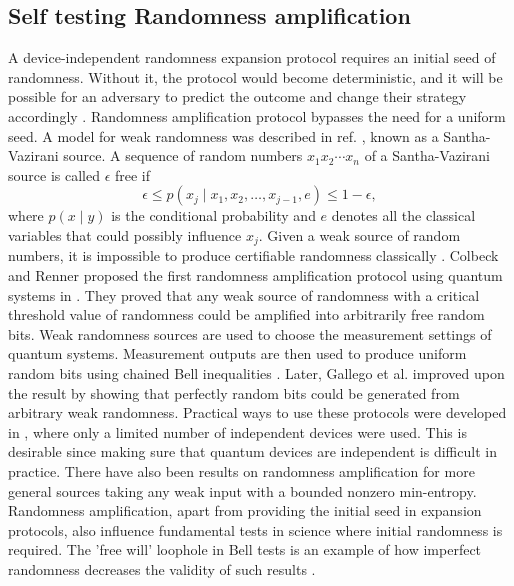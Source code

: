 \documentclass[]{interact}
\theoremstyle{plain}%
\theoremstyle{definition}
\theoremstyle{remark}
\begin{document}
\subsection{ Self testing Randomness amplification} 
\label{randampDI}
A device-independent randomness expansion protocol requires an initial seed of randomness. Without it, the protocol would become deterministic, and it will be possible for an adversary to predict the outcome and change their strategy accordingly \cite{Colbeck_2012}. Randomness amplification protocol bypasses the need for a uniform seed. 
A model for weak randomness was described in ref. \cite{santha1986generating}, known as a Santha-Vazirani source. A sequence of random numbers $x_1x_2\cdots x_n$  of a  Santha-Vazirani source is called  $\epsilon$ free   if $$\epsilon \leq p\left(x_{j} \mid x_{1}, x_{2}, \ldots, x_{j-1}, e\right) \leq 1- \epsilon,$$ where $p\left(x\mid y\right)$ is the conditional probability and $e$ denotes all the classical variables that could possibly influence $x_{j}$. Given a weak source of random numbers, it is impossible to produce certifiable randomness classically \cite{santha1986generating}. Colbeck and Renner proposed the first randomness amplification protocol using quantum systems in \cite{Colbeck_2012}. They proved that any  weak
source of randomness with a critical threshold value of randomness could be amplified
into arbitrarily free random bits. Weak randomness sources are used to choose the measurement settings of quantum systems. Measurement outputs are then used to produce uniform random bits using chained Bell inequalities \cite{Braunstein1990Aug}. Later, Gallego et al. \cite{Gallego_2013} improved upon the result by showing that perfectly random bits could be generated from arbitrary weak randomness. Practical ways to use these protocols were developed in \cite{brandao2016realistic}, where only a limited number of independent devices were used. This is desirable since making sure that quantum devices are independent is difficult in practice. There have also been results on randomness amplification for more general sources taking any weak input with a bounded nonzero min-entropy\cite{chung2016general,PLESCH20142938,Bouda2014Sep}. Randomness amplification, apart from providing the initial seed in expansion protocols, also influence fundamental tests in science where initial randomness is required. The 'free will' loophole in Bell tests is an example of how imperfect randomness decreases the validity of such results \cite{koh2012effects}.
\end{document}
